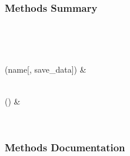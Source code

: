 \documentclass[letterpaper,10pt,english]{sphinxmanual}
\begin{document}
\begin{fulllineitems}
\begin{description}
\begin{description}
\begin{description}
\end{description}

\end{description}

\end{description}
\subsubsection*{Methods Summary}


\begin{savenotes}\sphinxatlongtablestart\begin{longtable}[c]{}
\hline

\endfirsthead

%
{}\\
\hline

\endhead

\hline
{}\\
\endfoot

\endlastfoot

{\hyperref[\detokenize{api/mastml.datasets.MatminerDatasets:mastml.datasets.MatminerDatasets.download_data}]{}}(name{[}, save\_data{]})
&

\\
\hline
{\hyperref[\detokenize{api/mastml.datasets.MatminerDatasets:mastml.datasets.MatminerDatasets.get_available_datasets}]{}}()
&

\\
\hline
\end{longtable}\sphinxatlongtableend\end{savenotes}
\subsubsection*{Methods Documentation}

\begin{fulllineitems}
\label{\detokenize{api/mastml.datasets.MatminerDatasets:mastml.datasets.MatminerDatasets.download_data}}
\end{fulllineitems}


\end{fulllineitems}
\end{document}
